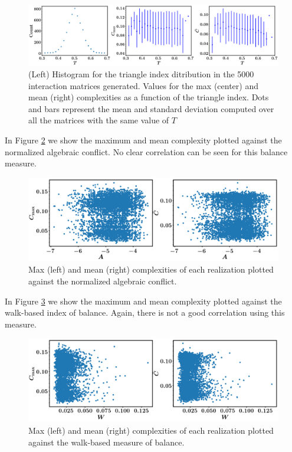 \documentclass[10pt]{article}
\begin{document}
\begin{figure}[H]
	\centering
\includegraphics[scale=0.27]{../figs/C_vs_T.png}
	\caption{(Left) Histogram for the triangle index ditribution in the 5000 interaction matrices generated. Values for the max (center) and mean (right) complexities as a function of the triangle index. Dots and bars represent the mean and standard deviation computed over all the matrices with the same value of $T$ \label{fig:C_vs_T}}
\end{figure}

In Figure \ref{fig:C_vs_A} we show the maximum and mean complexity plotted against the normalized algebraic conflict.  No clear correlation can be seen for this balance measure.

\begin{figure}[H]
	\centering
\includegraphics[scale=0.35]{../figs/C_vs_A.png}
	\caption{Max (left) and mean (right) complexities of each realization plotted against the normalized algebraic conflict. \label{fig:C_vs_A}}
\end{figure}


In Figure \ref{fig:C_vs_W} we show the maximum and mean complexity plotted against the walk-based index of balance.  Again, there is not a good correlation using this measure.

\begin{figure}[H]
	\centering
\includegraphics[scale=0.35]{../figs/C_vs_W.png}
	\caption{Max (left) and mean (right) complexities of each realization plotted against the walk-based measure of balance. \label{fig:C_vs_W}}
\end{figure}




\end{document}
